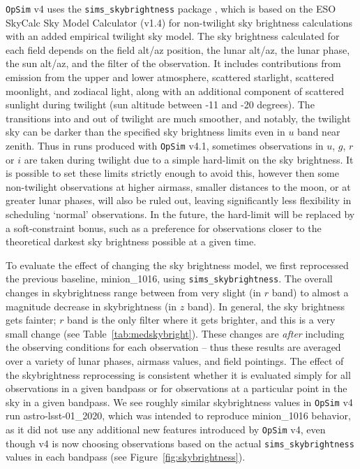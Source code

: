 \documentclass[DM,authoryear,toc]{lsstdoc}
\newcommand{\opsim}{\texttt{OpSim}\xspace}
\newcommand{\simsky}{\texttt{sims\_skybrightness}\xspace}
\begin{document}
\opsim v4 uses the \simsky package \citep{2016SPIE.9910E..1AY}, which is based on the ESO SkyCalc Sky Model Calculator  (v1.4) for non-twilight sky brightness calculations with an added empirical twilight sky model. The sky brightness calculated for each field depends on the field alt/az position, the lunar alt/az, the lunar phase, the sun alt/az, and the filter of the observation. It includes contributions from emission from the upper and lower atmosphere, scattered starlight, scattered moonlight, and zodiacal light, along with an additional component of scattered sunlight during twilight (sun altitude between -11 and -20 degrees). The transitions into and out of twilight are much smoother, and notably, the twilight sky can be darker than the specified sky brightness limits even in $u$ band near zenith. Thus in runs produced with \opsim v4.1, sometimes observations in $u$, $g$, $r$ or $i$ are taken during twilight due to a simple hard-limit on the sky brightness. It is possible to set these limits strictly enough to avoid this, however then some non-twilight observations at higher airmass, smaller distances to the moon, or at greater lunar phases, will also be ruled out, leaving significantly less flexibility in scheduling `normal' observations. In the future, the hard-limit will be replaced by a soft-constraint bonus, such as a preference for observations closer to the theoretical darkest sky brightness possible at a given time.


To evaluate the effect of changing the sky brightness model, we first reprocessed the previous baseline, minion\_1016, using \simsky. The overall changes in skybrightness range between from very slight (in $r$ band) to almost a magnitude decrease in skybrightness (in $z$ band). In general, the sky brightness gets fainter; $r$ band is the only filter where it gets brighter, and this is a very small change (see Table~\ref{tab:medskybright}). These changes are {\it after} including the observing conditions for each observation -- thus these results are averaged over a variety of lunar phases, airmass values, and field pointings. The effect of the skybrightness reprocessing is consistent whether it is evaluated simply for all observations in a given bandpass or for observations at a particular point in the sky in a given bandpass. We see roughly similar skybrightness values in \opsim v4 run astro-lsst-01\_2020, which was intended to reproduce minion\_1016 behavior, as it did not use any additional new features introduced by \opsim v4, even though v4 is now choosing observations based on the actual \simsky values in each bandpass (see Figure~\ref{fig:skybrightness}).
\end{document}
